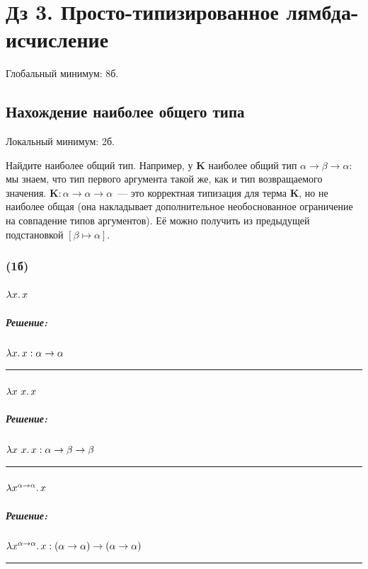 \documentclass{article}
\newenvironment{proof}{\subparagraph{\hspace{-1em}Решение:\newline}\-}{\par\noindent\rule{\textwidth}{0.4pt}}
\newcommand{\term}[1]{\mathbf{#1}}
\newcommand{\subst}[3]{\left[#2 \mapsto #3 \right] #1}
\begin{document}
    \section*{Дз 3. Просто-типизированное лямбда-исчисление}

    Глобальный минимум: 8б.

    \subsection{Нахождение наиболее общего типа}

    Локальный минимум: 2б.

    Найдите наиболее общий тип.
    Например, у $\term{K}$ наиболее общий тип $\alpha \to \beta \to \alpha$: мы знаем, что тип первого аргумента такой же, как и тип возвращаемого значения.
    $\term{K} : \alpha \to \alpha \to \alpha$~--- это корректная типизация
    для терма $\term{K}$, но не наиболее общая (она накладывает дополнительное необоснованное ограничение на совпадение типов аргументов).
    Её можно получить из предыдущей подстановкой $\subst{}{\beta}{\alpha}$.

    \subsubsection{(1б)}

    \paragraph{} $\lambda x\ldotp x$

    \begin{proof}
        $\lambda x \ldotp x : \alpha \to \alpha$
    \end{proof}

    \paragraph{} $\lambda x~x\ldotp x$

    \begin{proof}
        $\lambda x~x\ldotp x : \alpha \to \beta \to \beta$
    \end{proof}

    \paragraph{} $\lambda x^{\alpha \to \alpha}\ldotp x$

    \begin{proof}
        $\lambda x^{\alpha \to \alpha}\ldotp x : (\alpha \to \alpha) \to (\alpha \to \alpha)$
    \end{proof}
\end{document}
